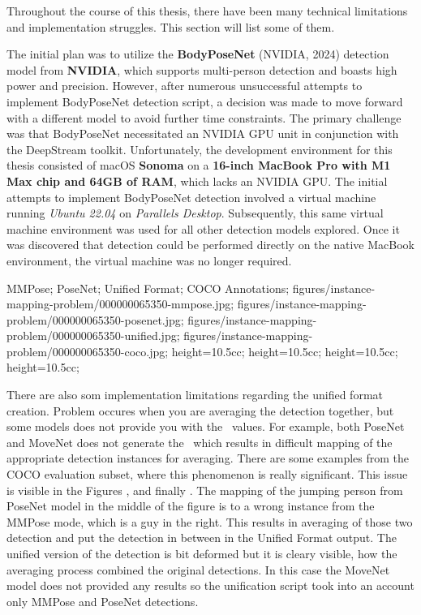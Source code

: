 Throughout the course of this thesis, there have been many technical limitations and implementation struggles. This section will list some of them.

The initial plan was to utilize the {\bf BodyPoseNet} (NVIDIA, 2024) detection model from {\bf NVIDIA}, which supports multi-person detection and boasts high power and precision. However, after numerous unsuccessful attempts to implement BodyPoseNet detection script, a decision was made to move forward with a different model to avoid further time constraints. The primary challenge was that BodyPoseNet necessitated an NVIDIA GPU unit in conjunction with the DeepStream toolkit. Unfortunately, the development environment for this thesis consisted of macOS {\bf Sonoma} on a {\bf 16-inch MacBook Pro with M1 Max chip and 64GB of RAM}, which lacks an NVIDIA GPU. The initial attempts to implement BodyPoseNet detection involved a virtual machine running {\em Ubuntu 22.04} on {\em Parallels Desktop}. Subsequently, this same virtual machine environment was used for all other detection models explored. Once it was discovered that detection could be performed directly on the native MacBook environment, the virtual machine was no longer required.

    {
        MMPose;
        PoseNet;
        Unified Format;
        COCO Annotations;
    }
    {
        figures/instance-mapping-problem/000000065350-mmpose.jpg;
        figures/instance-mapping-problem/000000065350-posenet.jpg;
        figures/instance-mapping-problem/000000065350-unified.jpg;
        figures/instance-mapping-problem/000000065350-coco.jpg;
    }
    {
        height=10.5cc;
        height=10.5cc;
        height=10.5cc;
        height=10.5cc;
    }

There are also som implementation limitations regarding the unified format creation. Problem occures when you are averaging the detection together, but some models does not provide you with the \BBOX\ values. For example, both PoseNet and MoveNet does not generate the \BBOX\ which results in difficult mapping of the appropriate detection instances for averaging. There are some examples from the COCO evaluation subset, where this phenomenon is really significant. This issue is visible in the Figures ,  and finally . The mapping of the jumping person from PoseNet model in the middle of the figure is to a wrong instance from the MMPose mode, which is a guy in the right. This results in averaging of those two detection and put the detection in between in the Unified Format output. The unified version of the detection is bit deformed but it is cleary visible, how the averaging process combined the original detections. In this case the MoveNet model does not provided any results so the unification script took into an account only MMPose and PoseNet detections.

